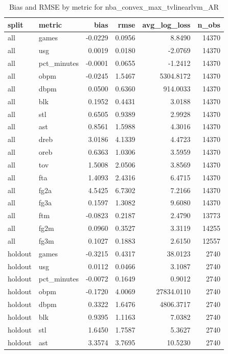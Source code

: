 \begin{table}
\caption{Bias and RMSE by metric for nba_convex_max_tvlinearlvm_AR}
\label{tab:nba_convex_max_tvlinearlvm_AR_bias_rmse}
\begin{tabular}{llrrrr}
\toprule
split & metric & bias & rmse & avg\_log\_loss & n\_obs \\
\midrule
all & games & -0.0229 & 0.0956 & 8.8490 & 14370 \\
all & usg & 0.0019 & 0.0180 & -2.0769 & 14370 \\
all & pct\_minutes & -0.0001 & 0.0655 & -1.2412 & 14370 \\
all & obpm & -0.0245 & 1.5467 & 5304.8172 & 14370 \\
all & dbpm & 0.0500 & 0.6360 & 914.0033 & 14370 \\
all & blk & 0.1952 & 0.4431 & 3.0188 & 14370 \\
all & stl & 0.6505 & 0.9389 & 2.9928 & 14370 \\
all & ast & 0.8561 & 1.5988 & 4.3016 & 14370 \\
all & dreb & 3.0186 & 4.1339 & 4.4723 & 14370 \\
all & oreb & 0.6363 & 1.0306 & 3.5959 & 14370 \\
all & tov & 1.5008 & 2.0506 & 3.8569 & 14370 \\
all & fta & 1.4093 & 2.4316 & 6.4715 & 14370 \\
all & fg2a & 4.5425 & 6.7302 & 7.2166 & 14370 \\
all & fg3a & 0.1597 & 1.3082 & 9.6080 & 14370 \\
all & ftm & -0.0823 & 0.2187 & 2.4790 & 13773 \\
all & fg2m & 0.0960 & 0.3527 & 3.3119 & 14255 \\
all & fg3m & 0.1027 & 0.1883 & 2.6150 & 12557 \\
holdout & games & -0.3215 & 0.4317 & 38.0123 & 2740 \\
holdout & usg & 0.0112 & 0.0466 & 3.1087 & 2740 \\
holdout & pct\_minutes & -0.0072 & 0.1649 & 0.9012 & 2740 \\
holdout & obpm & -0.1720 & 4.0069 & 27834.0110 & 2740 \\
holdout & dbpm & 0.3322 & 1.6476 & 4806.3717 & 2740 \\
holdout & blk & 0.9395 & 1.1163 & 7.0382 & 2740 \\
holdout & stl & 1.6450 & 1.7587 & 5.3627 & 2740 \\
holdout & ast & 3.3574 & 3.7695 & 10.5230 & 2740 \\

\end{tabular}
\end{table}
